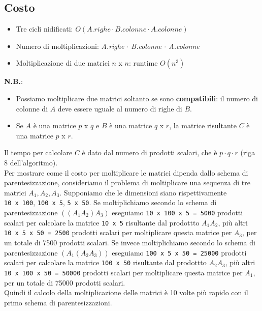 \subsection{Costo}

\begin{itemize}
  \item Tre cicli nidificati: $O(A.righe \cdot B.colonne \cdot A.colonne)$
  \item Numero di moltiplicazioni: \emph{A.righe $\cdot$ B.colonne $\cdot$ A.colonne}
  \item Moltiplicazione di due matrici $n$ x $n$: runtime $O(n^3)$
\end{itemize}

\textbf{N.B.}:
\begin{itemize}
  \item Possiamo moltiplicare due matrici soltanto se sono
        \textbf{compatibili}: il numero di colonne di $A$ deve essere uguale
        al numero di righe di $B$.
  \item Se $A$ è una matrice $p$ x $q$ e
        $B$ è una matrice $q$ x $r$, la matrice risultante $C$ è una
        matrice $p$ x $r$.
\end{itemize}

Il tempo per calcolare $C$ è dato dal numero di prodotti scalari, che
è $p \cdot q \cdot r$ (riga 8 dell'algoritmo).\\

Per mostrare come il costo per moltiplicare le matrici dipenda dallo
schema di parentesizzazione, consideriamo il problema di moltiplicare
una sequenza di tre matrici $A_1, A_2, A_3$. Supponiamo che le
dimensioni siano rispettivamente \texttt{10\ x\ 100},
\texttt{100\ x\ 5}, \texttt{5\ x\ 50}. Se moltiplichiamo secondo lo
schema di parentesizzazione $((A_1 A_2 )A_3)$ eseguiamo
\texttt{10\ x\ 100\ x\ 5\ =\ 5000} prodotti scalari per calcolare la
matrice \texttt{10\ x\ 5} risultante dal prodottto $A_1 A_2$, più
altri \texttt{10\ x\ 5\ x\ 50\ =\ 2500} prodotti scalari per
moltiplicare questa matrice per $A_3$, per un totale di 7500 prodotti
scalari. Se invece moltiplichiamo secondo lo schema di parentesizzazione
$(A_1 (A_2 A_3))$ eseguiamo \texttt{100\ x\ 5\ x\ 50\ =\ 25000}
prodotti scalari per calcolare la matrice \texttt{100\ x\ 50} risultante
dal prodottto $A_2 A_3$, più altri
\texttt{10\ x\ 100\ x\ 50\ =\ 50000} prodotti scalari per moltiplicare
questa matrice per $A_1$, per un totale di 75000 prodotti scalari.\\
Quindi il calcolo della moltiplicazione delle matrici è 10 volte più
rapido con il primo schema di parentesizzazioni.

